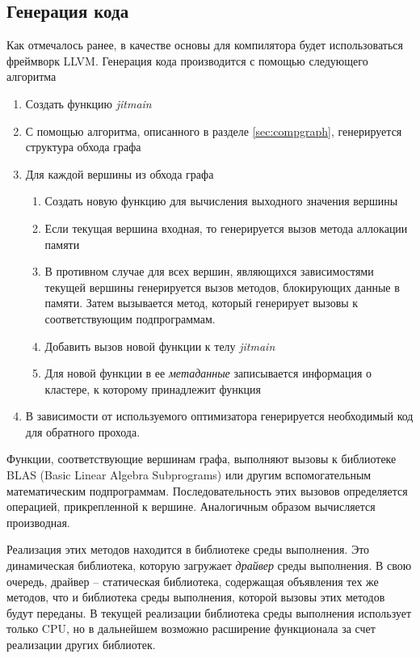 \subsection{Генерация кода}
Как отмечалось ранее, в качестве основы для компилятора будет использоваться
фреймворк LLVM. Генерация кода производится с помощью следующего алгоритма
\begin{enumerate}
    \item Создать функцию \textit{jitmain}
    \item С помощью алгоритма, описанного в разделе \ref{sec:compgraph},
        генерируется структура обхода графа
    \item Для каждой вершины из обхода графа
        \begin{enumerate}
            \item Создать новую функцию для вычисления выходного значения
                вершины
            \item Если текущая вершина входная, то генерируется вызов метода
                аллокации памяти
            \item В противном случае для всех вершин, являющихся зависимостями
                текущей вершины генерируется вызов методов, блокирующих
                данные в памяти. Затем вызывается метод, который генерирует
                вызовы к соответствующим подпрограммам.
            \item Добавить вызов новой функции к телу \textit{jitmain}
            \item Для новой функции в ее \textit{метаданные} записывается
                информация о кластере, к которому принадлежит функция
        \end{enumerate}
    \item В зависимости от используемого оптимизатора генерируется необходимый
        код для обратного прохода.
\end{enumerate}

Функции, соответствующие вершинам графа, выполняют вызовы к библиотеке BLAS
(Basic Linear Algebra Subprograms) или другим вспомогательным математическим
подпрограммам. Последовательность этих вызовов определяется операцией, прикрепленной
к вершине. Аналогичным образом вычисляется производная.

Реализация этих методов находится в библиотеке среды выполнения. Это динамическая
библиотека, которую загружает \textit{драйвер} среды выполнения. В свою очередь,
драйвер -- статическая библиотека, содержащая объявления тех же методов, что и
библиотека среды выполнения, которой вызовы этих методов будут переданы.
В текущей реализации библиотека среды выполнения использует только CPU,
но в дальнейшем возможно расширение функционала за счет реализации других
библиотек.

